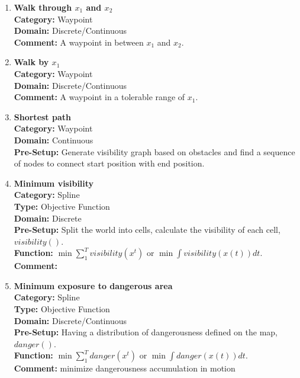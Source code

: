 \documentclass[12pt]{article}
\begin{document}
\begin{enumerate}


\item \textbf{Walk through $ x_{1} $ and $ x_{2} $} \\
\label{obj:walk_through}
\textbf{Category:} Waypoint \\
\textbf{Domain:} Discrete/Continuous \\
\textbf{Comment:} A waypoint in between $ x_{1} $ and $ x_{2} $.


\item \textbf{Walk by $ x_{1} $} \\
\label{obj:walk_by}
\textbf{Category:} Waypoint \\
\textbf{Domain:} Discrete/Continuous \\
\textbf{Comment:} A waypoint in a tolerable range of $ x_{1} $. \\


\item \textbf{Shortest path} \\
\label{obj:short_path}
\textbf{Category:} Waypoint \\
\textbf{Domain:} Continuous \\
\textbf{Pre-Setup:} Generate visibility graph based on obstacles and find a sequence of nodes to connect start position with end position.

\item \textbf{Minimum visibility} \\
\label{obj:min_vis}
\textbf{Category:} Spline \\
\textbf{Type:} Objective Function \\
\textbf{Domain:} Discrete \\
\textbf{Pre-Setup:} Split the world into cells, calculate the visibility of each cell, $ visibility() $. \\
\textbf{Function:} $ \min \sum_{1}^{T} visibility(x^{t}) $ or $ \min \int visibility(x(t)) dt $. \\
\textbf{Comment:} \\

\item \textbf{Minimum exposure to dangerous area} \\
\label{obj:min_danger}
\textbf{Category:} Spline \\
\textbf{Type:} Objective Function \\
\textbf{Domain:} Discrete/Continuous \\
\textbf{Pre-Setup:} Having a distribution of dangerousness defined on the map, $ danger() $. \\
\textbf{Function:} $ \min \sum_{1}^{T} danger(x^{t}) $ or $ \min \int danger(x(t)) dt $. \\
\textbf{Comment:} minimize dangerousness accumulation in motion \\


\end{enumerate}
\end{document}
